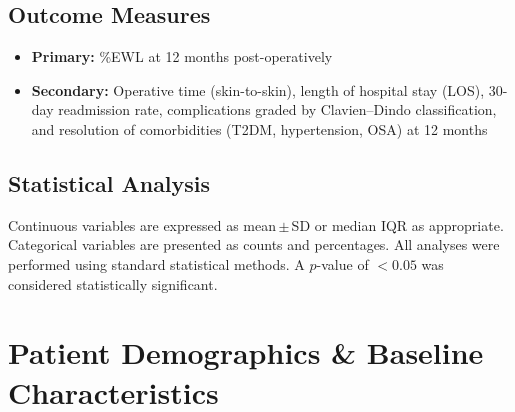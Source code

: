 \documentclass[11pt,a4paper]{article}
\begin{document}
\subsection{Outcome Measures}

\begin{itemize}[leftmargin=18pt, itemsep=2pt]
  \item \textbf{Primary:} \%EWL at 12 months post-operatively
  \item \textbf{Secondary:} Operative time (skin-to-skin), length of hospital stay (LOS),
    30-day readmission rate, complications graded by Clavien--Dindo classification,
    and resolution of comorbidities (T2DM, hypertension, OSA) at 12 months
\end{itemize}

\subsection{Statistical Analysis}

Continuous variables are expressed as mean\,$\pm$\,SD or median \lbrack IQR\rbrack{} as
appropriate. Categorical variables are presented as counts and percentages. All analyses
were performed using standard statistical methods. A $p$-value of $<0.05$ was considered
statistically significant.

\section{Patient Demographics \& Baseline Characteristics}
\end{document}
